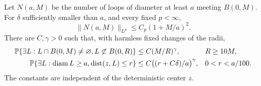 \begin{lemma}
\label{lem:rr-estimates}
Let $N(a,M)$ be the number of loops of diameter at least $a$ meeting
$B(0,M)$.  For $\delta$ sufficiently smaller than $a$, and every
fixed $p<\infty$,
\begin{equation}
 \|N(a,M)\|_{L^p}\le C_p(1+M/a)^2.
 \label{eq:rr-count}
\end{equation}
There are $C,\gamma>0$ such that, with harmless fixed changes of the
radii,
\begin{align}
 \mathbb P\{\exists L:L\cap B(0,M)\ne\varnothing,
                            L\not\subset B(0,R)\}
      &\le C(M/R)^\gamma, && R\ge10M,
       \label{eq:rr-escape}\\
 \mathbb P\{\exists L:\operatorname{diam} L\ge a,
                       \operatorname{dist}(z,L)\le r\}
      &\le C\bigl((r+C\delta)/a\bigr)^\gamma,
          &&0<r<a/100.
       \label{eq:rr-point}
\end{align}
The constants are independent of the deterministic center $z$.
\end{lemma}

